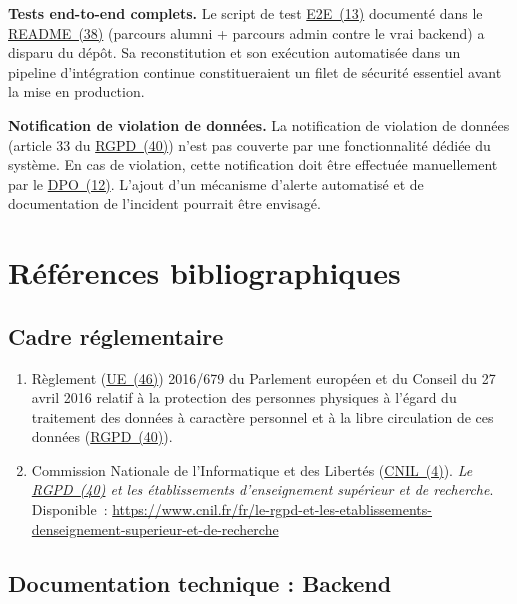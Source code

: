 \documentclass[12pt,a4paper]{report}
\begin{document}
\textbf{Tests end-to-end complets.} Le script de test \hyperlink{abbr-E2E}{E2E~(13)} documenté dans le \hyperlink{abbr-README}{README~(38)} (parcours alumni + parcours admin contre le vrai backend) a disparu du dépôt. Sa reconstitution et son exécution automatisée dans un pipeline d'intégration continue constitueraient un filet de sécurité essentiel avant la mise en production.

\textbf{Notification de violation de données.} La notification de violation de données (article 33 du \hyperlink{abbr-RGPD}{RGPD~(40)}) n'est pas couverte par une fonctionnalité dédiée du système. En cas de violation, cette notification doit être effectuée manuellement par le \hyperlink{abbr-DPO}{DPO~(12)}. L'ajout d'un mécanisme d'alerte automatisé et de documentation de l'incident pourrait être envisagé.

\chapter*{Références bibliographiques}

\section*{Cadre réglementaire}

\begin{enumerate}
  \item Règlement (\hyperlink{abbr-UE}{UE~(46)}) 2016/679 du Parlement européen et du Conseil du 27 avril 2016 relatif à la protection des personnes physiques à l'égard du traitement des données à caractère personnel et à la libre circulation de ces données (\hyperlink{abbr-RGPD}{RGPD~(40)}).
  \item Commission Nationale de l'Informatique et des Libertés (\hyperlink{abbr-CNIL}{CNIL~(4)}). \textit{Le \hyperlink{abbr-RGPD}{RGPD~(40)} et les établissements d'enseignement supérieur et de recherche}. Disponible~: \url{https://www.cnil.fr/fr/le-rgpd-et-les-etablissements-denseignement-superieur-et-de-recherche}
\end{enumerate}

\section*{Documentation technique : Backend}
\end{document}
